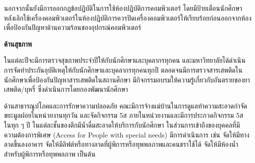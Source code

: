 นอกจากนั้นยังมีการออกกฎข้อปฏิบัติในการใช้ห้องปฏิบัติการคอมพิวเตอร์ โดยมีป้ายเตือนนักศึกษา หลังเลิกใช้เครื่องคอมพิวเตอร์ในห้องปฏิบัติการควรปิดเครื่องคอมพิวเตอร์ให้เรียบร้อยก่อนออกจากห้อง เพื่อป้องกันปัญหาด้านความร้อนของอุปกรณ์คอมพิวเตอร์

{\bf ด้านสุขภาพ}

ในแต่ละปีจะมีการตรวจสุขภาพประจำปีให้กับนักศึกษาและบุคลากรทุกคน และมหาวิทยาลัยได้ดำเนินการจัดทำประกันอุบัติเหตุให้กับนักศึกษาและบุคลากรทุกคนทุกปี ตลอดจนมีการตรวจสารเสพติดในนักศึกษาเพื่อป้องกันปัญหาสารเสพติดในสถานศึกษา มีกิจกรรมอบรมให้ความรู้เกี่ยวกับอันตรายของยาเสพติด/บุหรี่ ซึ่งดำเนินการโดยกองพัฒนานักศึกษา

ด้านสาธารณูปโภคและการรักษาความปลอดภัย
คณะมีการจ้างแม่บ้านในการดูแลทำความสะอาดกำจัดขยะมูลฝอยในหน่วยงานทุกวัน และจัดกิจกรรม 5ส ภายในหน่วยงานและมีการประกวดกิจกรรม 5ส ในทุก ๆ ปี ในแต่ละชั้นของตึกมีน้ำดื่มสะอาดให้บริการกับนักศึกษา
ในส่วนการเข้าถึงของบุคคลที่มีความต้องการพิเศษ (Access for People with special needs) มีการดำเนินการ เช่น จัดให้มีทางลาดขึ้นลงอาคาร จัดให้มีลิฟต์หรือทางลาดที่ผู้พิการหรือทุพพลภาพและคนชราใช้ได้  จัดให้มีห้องน้ำสำหรับผู้พิการหรือทุพพลภาพ เป็นต้น


\begin{doclist}
\end{doclist}

